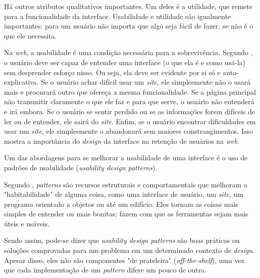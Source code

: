 Há outros atributos qualitativos importantes. Um deles é a utilidade, que remete para a funcionalidade da interface. Usabilidade e utilidade são igualmente importantes: para um usuário não importa que algo seja fácil de fazer, se não é o que ele necessita.

Na \textit{web}, a usabilidade é uma condição necessária para a sobrevivência. Segundo , o usuário deve ser capaz de entender uma interface (o que ela é e como usá-la) sem desprender esforço nisso. Ou seja, ela deve ser evidente por si só e auto-explicativa. Se o usuário achar difícil usar um \textit{site}, ele simplesmente não o usará mais e procurará outro que ofereça a mesma funcionalidade. Se a página principal não transmitir claramente o que ele faz e para que serve, o usuário não entenderá e irá embora. Se o usuário se sentir perdido ou se as informações forem difíceis de ler ou de entender, ele sairá do \textit{site}. Enfim, se o usuário encontrar dificuldades em usar um \textit{site}, ele simplesmente o abandonará sem maiores constrangimentos. Isso mostra a importância do \textit{design} da interface na retenção de usuários na \textit{web}.

Um das abordagens para se melhorar a usabilidade de uma interface é o uso de padrões de usabilidade (\textit{usability design patterns}).

Segundo , \textit{patterns} são recursos estruturais e comportamentais que melhoram a "habitabilidade" de alguma coisa, como uma interface de usuário, um \textit{site}, um programa orientado a objetos ou até um edifício. Eles tornam as coisas mais simples de entender ou mais bonitas; fazem com que as ferramentas sejam mais úteis e usáveis.

Sendo assim, pode-se dizer que \textit{usability design patterns} são boas práticas ou soluções comprovadas para um problema em um determinado contexto de \textit{design}. Apesar disso, eles não são componentes "de prateleira" (\textit{off-the-shelf}), uma vez que cada implementação de um \textit{pattern} difere um pouco de outra.


